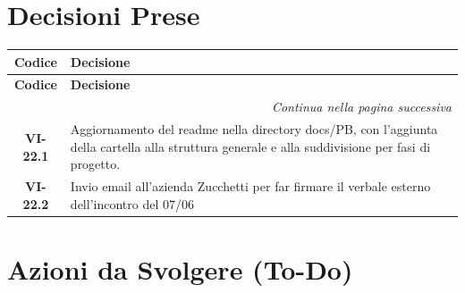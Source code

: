 \section{Decisioni Prese}

\renewcommand{\arraystretch}{1.3}
\vspace{-0.3cm}
\noindent
\begin{longtable}{c p{12cm}}
    \toprule
    \textbf{Codice} & \textbf{Decisione} \\
    \midrule
    \endfirsthead

    \toprule
    \textbf{Codice} & \textbf{Decisione} \\
    \midrule
    \endhead

    \midrule
    \multicolumn{2}{r}{\textit{Continua nella pagina successiva}} \\
    \midrule
    \endfoot

    \bottomrule
    \endlastfoot

    

    \textbf{VI-22.1} & Aggiornamento del readme nella directory docs/PB, con l’aggiunta della cartella alla struttura generale e alla suddivisione per fasi di progetto. \\

    \textbf{VI-22.2} & Invio email all'azienda Zucchetti per far firmare il verbale esterno dell'incontro del 07/06 \\

\end{longtable}

\section{Azioni da Svolgere (To-Do)}

